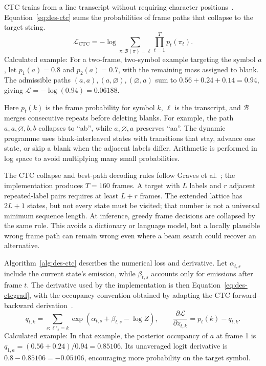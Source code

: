CTC trains from a line transcript without requiring character positions~\cite[PDF pp.~2--3]{graves2006}. Equation~\ref{eq:des-ctc} sums the probabilities of frame paths that collapse to the target string.
\begin{equation}
\mathcal L_{\mathrm{CTC}}=-\log\sum_{\pi:\mathcal B(\pi)=\boldsymbol\ell}
\prod_{t=1}^{T}p_t(\pi_t).
\label{eq:des-ctc}
\end{equation}
Calculated example: For a two-frame, two-symbol example targeting the symbol $a$, let $p_1(a)=0.8$ and $p_2(a)=0.7$, with the remaining mass assigned to blank. The admissible paths $(a,a),(a,\varnothing),(\varnothing,a)$ sum to $0.56+0.24+0.14=0.94$, giving $\mathcal L=-\log(0.94)=0.06188$.

Here $p_t(k)$ is the frame probability for symbol $k$, $\boldsymbol\ell$ is the transcript, and $\mathcal B$ merges consecutive repeats before deleting blanks. For example, the path $a,a,\varnothing,b,b$ collapses to ``ab'', while $a,\varnothing,a$ preserves ``aa''. The dynamic programme uses blank-interleaved states with transitions that stay, advance one state, or skip a blank when the adjacent labels differ. Arithmetic is performed in log space to avoid multiplying many small probabilities.

The CTC collapse and best-path decoding rules follow Graves et al.~\cite[PDF pp.~2--3]{graves2006}; the implementation produces $T=160$ frames. A target with $L$ labels and $r$ adjacent repeated-label pairs requires at least $L+r$ frames. The extended lattice has $2L+1$ states, but not every state must be visited; that number is not a universal minimum sequence length. At inference, greedy frame decisions are collapsed by the same rule. This avoids a dictionary or language model, but a locally plausible wrong frame path can remain wrong even where a beam search could recover an alternative.

Algorithm~\ref{alg:des-ctc} describes the numerical loss and derivative. Let $\alpha_{t,s}$ include the current state's emission, while $\beta_{t,s}$ accounts only for emissions after frame $t$. The derivative used by the implementation is then Equation~\ref{eq:des-ctcgrad}, with the occupancy convention obtained by adapting the CTC forward--backward derivation~\cite[PDF pp.~5--6]{graves2006}.
\begin{equation}
q_{t,k}=\sum_{s:\ell'_s=k}\exp(\alpha_{t,s}+\beta_{t,s}-\log Z),
\qquad \frac{\partial\mathcal L}{\partial z_{t,k}}=p_t(k)-q_{t,k}.
\label{eq:des-ctcgrad}
\end{equation}
Calculated example: In that example, the posterior occupancy of $a$ at frame 1 is $q_{1,a}=(0.56+0.24)/0.94=0.85106$. Its unaveraged logit derivative is $0.8-0.85106=-0.05106$, encouraging more probability on the target symbol.

